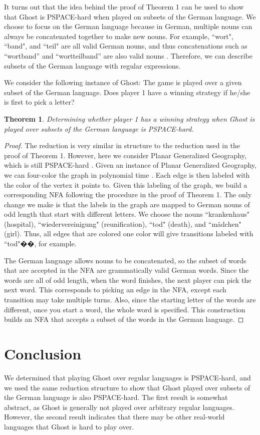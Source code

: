\documentclass[11pt]{article}
\newtheorem{theorem}{Theorem}
\begin{document}
It turns out that the idea behind the proof of Theorem 1 can be used to show that Ghost is PSPACE-hard when played on subsets of the German language. We choose to focus on the German language because in German, multiple nouns can always be concatenated together to make new nouns. For example, ``wort", ``band", and ``teil" are all valid German nouns, and thus concatenations such as “wortband” and “wortteilband” are also valid nouns \cite{german}. Therefore, we can describe subsets of the German language with regular expressions.

We consider the following instance of Ghost: The game is played over a given subset of the German language. Does player 1 have a winning strategy if he/she is first to pick a letter?

\begin{theorem}Determining whether player 1 has a winning strategy when Ghost is played over subsets of the German language is PSPACE-hard.
\end{theorem}

\begin{proof} The reduction is very similar in structure to the reduction used in the proof of Theorem 1. However, here we consider Planar Generalized Geography, which is still PSPACE-hard \cite{Sipser}. Given an instance of Planar Generalized Geography, we can four-color the graph in polynomial time \cite{planargraph}. Each edge is then labeled with the color of the vertex it points to. Given this labeling of the graph, we build a corresponding NFA following the procedure in the proof of Theorem 1. The only change we make is that the labels in the graph are mapped to German nouns of odd length that start with different letters. We choose the nouns ``krankenhaus" (hospital), ``wiedervereinigung" (reunification), ``tod" (death), and ``m{\"a}dchen" (girl). Thus, all edges that are colored one color will give transitions labeled with ``tod"��, for example. 

	The German language allows nouns to be concatenated, so the subset of words that are accepted in the NFA are grammatically valid German words. Since the words are all of odd length, when the word finishes, the next player can pick the next word. This corresponds to picking an edge in the NFA, except each transition may take multiple turns. Also, since the starting letter of the words are different, once you start a word, the whole word is specified. This construction builds an NFA that accepts a subset of the words in the German language. 
\end{proof}
\section{Conclusion}

We determined that playing Ghost over regular languages is PSPACE-hard, and we used the same reduction structure to show that Ghost played over subsets of the German language is also PSPACE-hard. The first result is somewhat abstract, as Ghost is generally not played over arbitrary regular languages. However, the second result indicates that there may be other real-world languages that Ghost is hard to play over.



\end{document}
